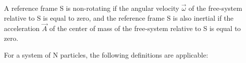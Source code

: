 \documentclass[10pt]{article}
\begin{document}
\par \bigskip \noindent A reference frame S is non-rotating if the angular velocity ${\vec{\omega}}$ of the free-system relative to S is equal to zero, and the reference frame S is also inertial if the acceleration ${\vec{\mathit{A}}}$ of the center of mass of the free-system relative to S is equal to zero.

\newpage

\par {}

\par \bigskip \noindent For a system of N particles, the following definitions are applicable:
\end{document}
